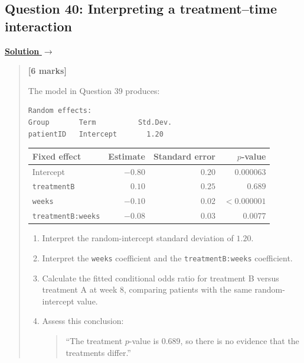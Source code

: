 \documentclass[11pt,a4paper]{article}
\newenvironment{examquestion}[2]
  {\subsection{#1}\label{question:\arabic{subsection}}\label{#2}%
   \noindent\hyperref[answer:\arabic{subsection}]{\textbf{Solution} $\rightarrow$}%
   \begin{quote}\color{statgrey}}
  {\end{quote}}
\begin{document}
\begin{examquestion}{Question 40: Interpreting a treatment--time interaction}{question:practice-interpreting-a-treatment-time-interaction}
\textbf{[6 marks]}

The model in Question 39 produces:
\begin{verbatim}
Random effects:
Group       Term          Std.Dev.
patientID   Intercept       1.20
\end{verbatim}
\begin{center}
\begin{tabular}{lrrr}
\hline
Fixed effect & Estimate & Standard error & $p$-value\\
\hline
Intercept & $-0.80$ & $0.20$ & $0.000063$\\
\texttt{treatmentB} & $0.10$ & $0.25$ & $0.689$\\
\texttt{weeks} & $-0.10$ & $0.02$ & $<0.000001$\\
\texttt{treatmentB:weeks} & $-0.08$ & $0.03$ & $0.0077$\\
\hline
\end{tabular}
\end{center}
\begin{enumerate}[label=(\alph*)]
  \item Interpret the random-intercept standard deviation of $1.20$.
  \item Interpret the \texttt{weeks} coefficient and the
        \texttt{treatmentB:weeks} coefficient.
  \item Calculate the fitted conditional odds ratio for treatment B
        versus treatment A at week 8, comparing patients with the same
        random-intercept value.
  \item Assess this conclusion:
        \begin{quote}
        ``The treatment $p$-value is $0.689$, so there is no evidence that
        the treatments differ.''
        \end{quote}
\end{enumerate}
\end{examquestion}

\clearpage
\end{document}
